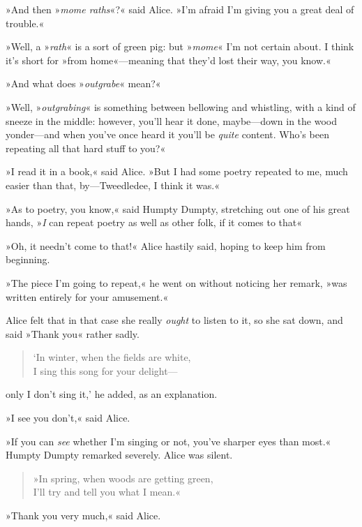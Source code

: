 »And then »\textit{mome raths}«?« said Alice. »I'm afraid I'm giving you a great deal of trouble.«

»Well, a »\textit{rath}« is a sort of green pig: but »\textit{mome}« I'm not certain about. I think it's short for »from home«—meaning that they'd lost their way, you know.«

»And what does »\textit{outgrabe}« mean?«

»Well, »\textit{outgrabing}« is something between bellowing and whistling, with a kind of sneeze in the middle: however, you'll hear it done, maybe—down in the wood yonder—and when you've once heard it you'll be \textit{quite} content. Who's been repeating all that hard stuff to you?«

»I read it in a book,« said Alice. »But I had some poetry repeated to me, much easier than that, by—Tweedledee, I think it was.«

»As to poetry, you know,« said Humpty Dumpty, stretching out one of his great hands, »\textit{I} can repeat poetry as well as other folk, if it comes to that\longdash«

»Oh, it needn't come to that!« Alice hastily said, hoping to keep him from beginning.

»The piece I'm going to repeat,« he went on without noticing her remark, »was written entirely for your amusement.«

Alice felt that in that case she really \textit{ought} to listen to it, so she sat down, and said »Thank you« rather sadly.

\begin{verse}
`In winter, when the fields are white,\\
\vin I sing this song for your delight—
\end{verse}

only I don't sing it,' he added, as an explanation.

»I see you don't,« said Alice.

»If you can \textit{see} whether I'm singing or not, you've sharper eyes than most.« Humpty Dumpty remarked severely. Alice was silent.

\begin{verse}
»In spring, when woods are getting green,\\
\vin I'll try and tell you what I mean.«
\end{verse}

»Thank you very much,« said Alice.

